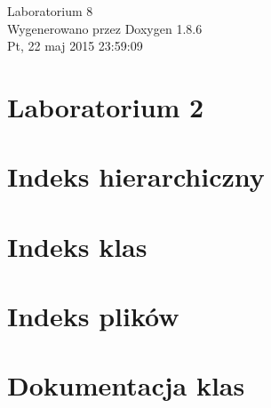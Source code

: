 \documentclass[twoside]{article}
\begin{document}
\hypersetup{pageanchor=false}
\begin{titlepage}
\vspace*{7cm}
\begin{center}%
{\Large Laboratorium 8 }\\
\vspace*{1cm}
{\large Wygenerowano przez Doxygen 1.8.6}\\
\vspace*{0.5cm}
{\small Pt, 22 maj 2015 23:59:09}\\
\end{center}
\end{titlepage}
\tableofcontents
{}
\hypersetup{pageanchor=true}

\section{Laboratorium 2}
\label{index}\hypertarget{index}{}
\section{Indeks hierarchiczny}

\section{Indeks klas}

\section{Indeks plików}

\section{Dokumentacja klas}






















\end{document}
